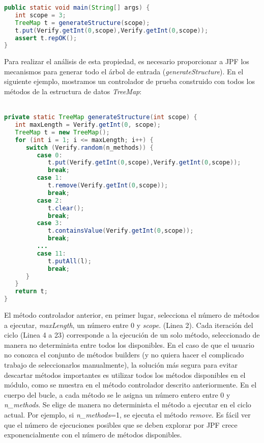 \begin{lstlisting}[caption={Probando el método put de TreeMap con JPF},label={lst:label},language=Java,captionpos=b]
public static void main(String[] args) {
   int scope = 3;
   TreeMap t = generateStructure(scope);
   t.put(Verify.getInt(0,scope),Verify.getInt(0,scope));
   assert t.repOK();
}
\end{lstlisting}

Para realizar el análisis de esta propiedad, es necesario proporcionar a JPF los mecanismos para generar todo el árbol de entrada (\textit{generateStructure}). 
En el siguiente ejemplo, mostramos un controlador de prueba construido con todos los métodos de la estructura de datos \textit{TreeMap}:
\\
\\
\begin{lstlisting}[caption={Controlador con todos los métodos},label={lst:driverAPI},language=Java,captionpos=b]
private static TreeMap generateStructure(int scope) {
   int maxLength = Verify.getInt(0, scope);
   TreeMap t = new TreeMap();
   for (int i = 1; i <= maxLength; i++) {
      switch (Verify.random(n_methods)) {
         case 0:
            t.put(Verify.getInt(0,scope),Verify.getInt(0,scope));
            break;
         case 1:
            t.remove(Verify.getInt(0,scope));
            break;						
         case 2:
            t.clear();
            break;
         case 3:
            t.containsValue(Verify.getInt(0,scope));
            break;
         ...
         case 11: 
            t.putAll(l);
            break;
      }
   }
   return t;
}
\end{lstlisting}

El método controlador anterior, en primer lugar, selecciona el número de métodos a ejecutar, \textit{maxLength}, un número entre 0 y \textit{scope}. (Linea 2). Cada iteración del ciclo (Linea 4 a 23) corresponde a la ejecución de un solo método, seleccionado de manera no determinista entre todos los disponibles. En el caso de que el usuario no conozca el conjunto de métodos builders (y no quiera hacer el complicado trabajo de seleccionarlos manualmente), la solución más segura para evitar descartar métodos importantes es utilizar todos los métodos disponibles en el módulo, como se muestra en el método controlador descrito anteriormente. En el cuerpo del bucle, a cada método se le asigna un número entero entre 0 y \textit{n\_methods}. Se elige de manera no determinista el método a ejecutar en el ciclo actual. Por ejemplo, si \textit{n\_methods}=1, se ejecuta el método \textit{remove}. Es fácil ver que el número de ejecuciones posibles que se deben explorar por JPF crece exponencialmente con el número de métodos disponibles.

